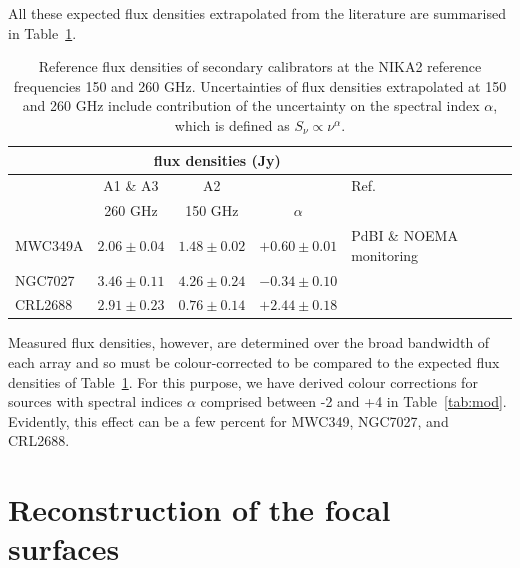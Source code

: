 \documentclass[traditionalabstract]{aa}
\begin{document}
{\begin{appendix}
All these expected flux densities extrapolated from the literature are
summarised in Table~\ref{tab:flux_ref_sec}.

\begin{table}[!thbp]
  \caption[Reference flux densities of secondary calibrators]{Reference flux densities of secondary calibrators at the NIKA2 reference frequencies 150 and 260 GHz. Uncertainties of flux densities extrapolated
    at 150 and 260 GHz include contribution of the uncertainty on the spectral index $\alpha$, which is defined as $S_{\nu} \propto \nu^{\alpha}$.}
  \label{tab:flux_ref_sec}
  \centering    
  \begin{tabular}{|l|c|c|c|l|}
    \hline\hline
    \multicolumn{1}{|c}{}  & \multicolumn{3}{|c}{flux  densities (Jy)} & \multicolumn{1}{|c|}{}  \\
    \hline
    &    A1 \& A3       &  A2             &            &   Ref. \\
    &  260 GHz          &  150 GHz        & $\alpha$ &      \\
    \hline
    MWC349A   &   $2.06\pm0.04$  &  $1.48\pm0.02$ &  $+0.60\pm0.01$      &  PdBI \& NOEMA monitoring  \\
    NGC7027  &   $3.46\pm0.11$   &  $4.26\pm0.24$  &  $-0.34\pm0.10$     &  \citet{Hoare1992}      \\
    CRL2688  &   $2.91\pm0.23$   &  $0.76\pm0.14$  &  $+2.44\pm0.18$     &  \citet{Dempsey2013_SCUBA2} \\
    \hline
  \end{tabular}
\end{table}

Measured flux densities, however, are determined over the broad
bandwidth of each array and so must be colour-corrected to be compared
to the expected flux densities of Table~\ref{tab:flux_ref_sec}.  For
this purpose, we have derived colour corrections for sources with spectral
indices $\alpha$ comprised between -2 and +4 in Table~\ref{tab:mod}. %
Evidently, this effect can be a few percent for MWC349, NGC7027, and CRL2688.


  \section{Reconstruction of the focal surfaces}
  \label{ap:focus_surfaces}


\end{appendix}}
\end{document}
